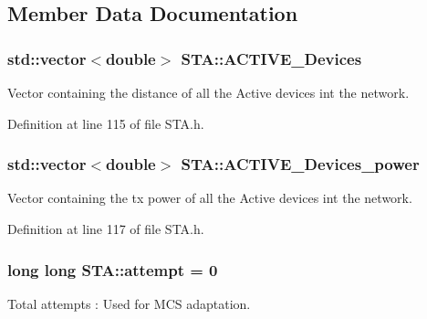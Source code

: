 \subsection{Member Data Documentation}
\hypertarget{classSTA_a536179d10f961ae6f7330b980a13668e}{
\subsubsection[{A\-C\-T\-I\-V\-E\-\_\-\-Devices}]{\setlength{\rightskip}{0pt plus 5cm}std\-::vector$<$double$>$ S\-T\-A\-::\-A\-C\-T\-I\-V\-E\-\_\-\-Devices}}\label{classSTA_a536179d10f961ae6f7330b980a13668e}


Vector containing the distance of all the Active devices int the network. 



Definition at line 115 of file S\-T\-A.\-h.

\hypertarget{classSTA_ae9a08d3223902c423ba041b7eba05e8c}{
\subsubsection[{A\-C\-T\-I\-V\-E\-\_\-\-Devices\-\_\-power}]{\setlength{\rightskip}{0pt plus 5cm}std\-::vector$<$double$>$ S\-T\-A\-::\-A\-C\-T\-I\-V\-E\-\_\-\-Devices\-\_\-power}}\label{classSTA_ae9a08d3223902c423ba041b7eba05e8c}


Vector containing the tx power of all the Active devices int the network. 



Definition at line 117 of file S\-T\-A.\-h.

\hypertarget{classSTA_a4cfeac60ce7a13a4bbae68b756655dc9}{
\subsubsection[{attempt}]{\setlength{\rightskip}{0pt plus 5cm}long long S\-T\-A\-::attempt = 0}}\label{classSTA_a4cfeac60ce7a13a4bbae68b756655dc9}


Total attempts \-: Used for M\-C\-S adaptation. 



